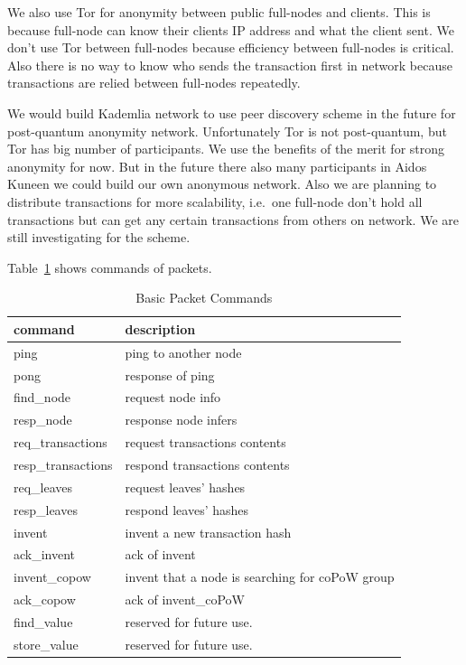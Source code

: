 \documentclass[a4paper,10pt,twocolumn]{article}
\begin{document}
We also use Tor for anonymity between public full-nodes and clients. This is because 
full-node can know their clients IP address and what the client sent.  We don't use Tor between full-nodes because efficiency between
full-nodes is critical. Also  there is no way to know who sends the transaction first in network because transactions are relied between 
full-nodes repeatedly.

We would build Kademlia network to use peer discovery scheme in the future for post-quantum anonymity network. 
Unfortunately Tor is not post-quantum, but Tor has big number of participants. We use the benefits of the merit
for strong anonymity for now. But in the future there also many participants in Aidos Kuneen we could build our own anonymous network.
Also we are planning to distribute transactions for more scalability, i.e.\ one full-node don't hold all transactions but can get any certain
transactions from others on network.
We are still investigating for the scheme.

Table~\ref{tbl:cmd} shows commands of packets.


 \begin{table}[htb]
	\caption{Basic Packet Commands}
    \label{tbl:cmd}
	\begin{tabularx}{\linewidth}{XX} 
		command & description \\
		\toprule
  ping & ping to another node \\
  pong & response of ping \\
  find\_node & request node info\\
    resp\_node & response node infers \\
  req\_transactions & request transactions contents \\
  resp\_transactions & respond transactions contents \\
  req\_leaves & request  leaves' hashes \\
  resp\_leaves &  respond leaves' hashes \\
  invent &  invent a new transaction hash \\
  ack\_invent & ack of invent \\
  invent\_copow & invent that a node is searching for coPoW group \\
  ack\_copow & ack of invent\_coPoW \\
  find\_value &  reserved for future use.\\
  store\_value & reserved for future use.\\
  \bottomrule
\end{tabularx}
  \end{table}
\end{document}
